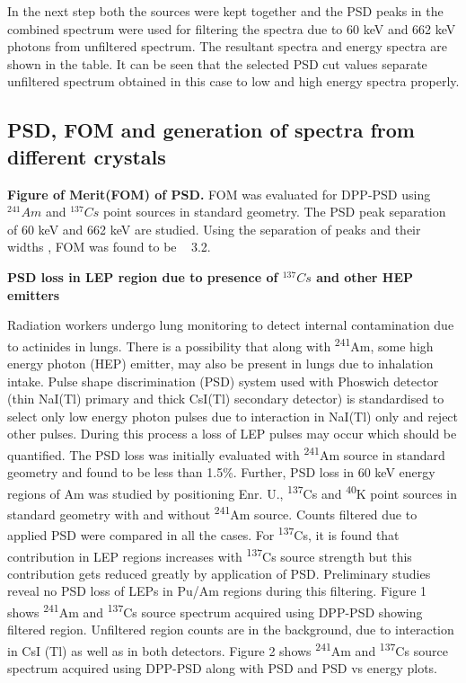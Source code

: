 \documentclass[10pt]{article}
\begin{document}
In the next step both the sources were kept together and the PSD peaks in the combined spectrum were used for filtering the spectra due to 60 keV and 662 keV photons from unfiltered spectrum. The resultant spectra and energy spectra are shown in the table. It can be seen that the selected PSD cut values separate unfiltered spectrum obtained in this case to low and high energy spectra properly.

\subsection*{PSD, FOM and generation of spectra from different crystals}

    \textbf{Figure of Merit(FOM) of PSD.}
    FOM was evaluated for DPP-PSD using $^{241}Am$ and $^{137}Cs$ point sources in standard geometry. The PSD peak separation of 60 keV and 662 keV are studied. Using the separation of peaks and their widths \cite{knoll2010radiation}, FOM was found to be ~ 3.2.
    
    \textbf{PSD loss in LEP region due to presence of $^{137}Cs$ and other HEP emitters}
    
    Radiation workers undergo lung monitoring to detect internal contamination due to actinides in lungs. There is a possibility that along with \textsuperscript{241}Am, some high energy photon (HEP) emitter, may also be present in lungs due to inhalation intake. Pulse shape discrimination (PSD) system used with Phoswich detector (thin NaI(Tl) primary and thick CsI(Tl) secondary detector) is standardised to select only low energy photon pulses due to interaction in NaI(Tl) only and reject other pulses. During this process a loss of LEP pulses may occur which should be quantified.   
    The PSD loss was initially evaluated with \textsuperscript{241}Am source in standard geometry and found to be less than 1.5\%. Further, PSD loss in 60 keV energy regions of Am was studied by positioning Enr. U., \textsuperscript{137}Cs and \textsuperscript{40}K point sources in standard geometry with and without \textsuperscript{241}Am source. Counts filtered due to applied PSD were compared in all the cases. For \textsuperscript{137}Cs, it is found that contribution in LEP regions increases with \textsuperscript{137}Cs source strength but this contribution gets reduced greatly by application of PSD. Preliminary studies reveal no PSD loss of LEPs in Pu/Am regions during this filtering. Figure 1 shows \textsuperscript{241}Am and \textsuperscript{137}Cs source spectrum acquired using DPP-PSD showing filtered region. Unfiltered region counts are in the background, due to interaction in CsI (Tl) as well as in both detectors. Figure 2 shows \textsuperscript{241}Am and \textsuperscript{137}Cs source spectrum acquired using DPP-PSD along with PSD and PSD vs energy plots. 
    
\end{document}
